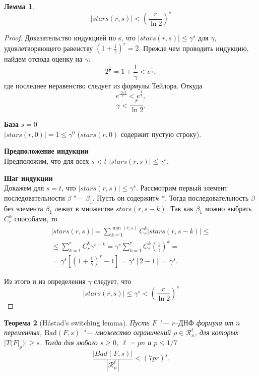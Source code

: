 \documentclass[12pt]{article}
\theoremstyle{plain}
\newtheorem{theorem}{Теорема}
\theoremstyle{remark}
\theoremstyle{definition}
\newtheorem{lemma}[theorem]{Лемма}
\begin{document}
\begin{lemma}
\[|stars(r, s)|  < \left( \frac{r}{\ln2}\right)^s \]
\end{lemma}
\begin{proof}
Доказательство индукцией по s, что $|stars(r, s)| \le \gamma^s$ для $\gamma$, удовлетворяющего равенству $(1 + \frac1\gamma)^r = 2$. Прежде чем проводить индукцию, найдем отсюда оценку на $\gamma$:
\[ 2^{\frac1r} = 1 + \frac1\gamma < e^\frac1\gamma,\]
где последнее неравенство следует из формулы Тейлора.
Откуда
\[ e^{\frac{\ln2}{r}}  < e^{\frac1\gamma},\]
\[ \gamma < \frac{r}{\ln2}. \] 

\textbf{База}
$s = 0$ \\ $|stars(r, 0)| = 1 \le \gamma^0$ ($stars(r, 0)$ содержит пустую строку).

\textbf{Предположение индукции} \\
Предположим, что для всех $s < t$ $|stars(r, s)| \le \gamma^s$.

\textbf{Шаг индукции} \\
Докажем для $s = t$, что  $|stars(r, s)| \le \gamma^s$. Рассмотрим первый элемент последовательности $\beta$ "--- $\beta_1$. Пусть он содержит$k$ $*$.  Тогда последовательность $\beta$ без элемента $\beta_1$ лежит в множестве $stars(r, s - k)$. Так как $\beta_1$ можно выбрать $C_r^k$ способами, то
\begin{gather*}
 |stars(r, s)| = \sum_{k = 1}^{\min(r, s)} C_r^k|stars(r, s - k)| \le \\ \le \sum_{k = 1}^{r} C_r^k \gamma^{s - k} = \gamma^s \sum_{k = 1}^r C_r^k \left(\frac1\gamma\right)^k = \\ = \gamma^s \left[\left(1 + \frac1\gamma\right)^r - 1\right] = \gamma^s [2 - 1] = \gamma^s.
 \end{gather*}

Из этого и из определения $\gamma$ следует, что 
\[  |stars(r, s)| \le \gamma^s < \left( \frac{r}{\ln2}\right)^s \]
 
\end{proof}

\begin{theorem}[H\aa stad's switching lemma]
Пусть $F$ "--- $r\text{--ДНФ}$ формула от $n$ переменных, $\text{Bad}(F, s)$ "--- множество ограничений $\rho \in \mathcal{R}_n^\ell $, для которых  $|T(F|_\rho)| \ge s$. Тогда для любого $s \ge 0$, $\ell = pn$ и $p \le 1/7$
\[ \frac{|Bad(F, s)|}{|\mathcal{R}_n^\ell |} < (7pr)^s.\]

\end{theorem}
\end{document}
